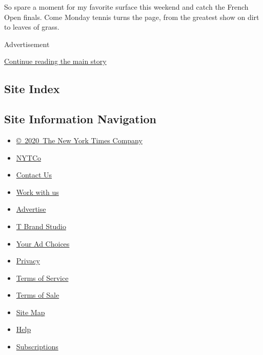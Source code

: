 So spare a moment for my favorite surface this weekend and catch the
French Open finals. Come Monday tennis turns the page, from the greatest
show on dirt to leaves of grass.

Advertisement

\protect\hyperlink{after-bottom}{Continue reading the main story}

\hypertarget{site-index}{%
\subsection{Site Index}\label{site-index}}

\hypertarget{site-information-navigation}{%
\subsection{Site Information
Navigation}\label{site-information-navigation}}

\begin{itemize}
\tightlist
\item
  \href{https://help.nytimes3xbfgragh.onion/hc/en-us/articles/115014792127-Copyright-notice}{©~2020~The
  New York Times Company}
\end{itemize}

\begin{itemize}
\tightlist
\item
  \href{https://www.nytco.com/}{NYTCo}
\item
  \href{https://help.nytimes3xbfgragh.onion/hc/en-us/articles/115015385887-Contact-Us}{Contact
  Us}
\item
  \href{https://www.nytco.com/careers/}{Work with us}
\item
  \href{https://nytmediakit.com/}{Advertise}
\item
  \href{http://www.tbrandstudio.com/}{T Brand Studio}
\item
  \href{https://www.nytimes3xbfgragh.onion/privacy/cookie-policy\#how-do-i-manage-trackers}{Your
  Ad Choices}
\item
  \href{https://www.nytimes3xbfgragh.onion/privacy}{Privacy}
\item
  \href{https://help.nytimes3xbfgragh.onion/hc/en-us/articles/115014893428-Terms-of-service}{Terms
  of Service}
\item
  \href{https://help.nytimes3xbfgragh.onion/hc/en-us/articles/115014893968-Terms-of-sale}{Terms
  of Sale}
\item
  \href{https://spiderbites.nytimes3xbfgragh.onion}{Site Map}
\item
  \href{https://help.nytimes3xbfgragh.onion/hc/en-us}{Help}
\item
  \href{https://www.nytimes3xbfgragh.onion/subscription?campaignId=37WXW}{Subscriptions}
\end{itemize}
